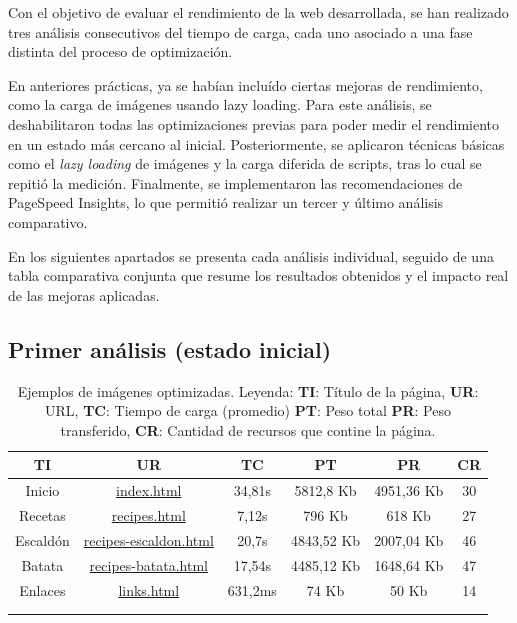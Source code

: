 \documentclass{article}
\begin{document}
Con el objetivo de evaluar el rendimiento de la web desarrollada, se han realizado tres análisis consecutivos del tiempo de carga, cada uno asociado a una fase distinta del proceso de optimización.

En anteriores prácticas, ya se habían incluído ciertas mejoras de rendimiento, como la carga de imágenes usando lazy loading. Para este análisis, se deshabilitaron todas las optimizaciones previas para poder medir el rendimiento en un estado más cercano al inicial. Posteriormente, se aplicaron técnicas básicas como el \textit{lazy loading} de imágenes y la carga diferida de scripts, tras lo cual se repitió la medición. Finalmente, se implementaron las recomendaciones de PageSpeed Insights, lo que permitió realizar un tercer y último análisis comparativo.

En los siguientes apartados se presenta cada análisis individual, seguido de una tabla comparativa conjunta que resume los resultados obtenidos y el impacto real de las mejoras aplicadas.

\subsection{Primer análisis (estado inicial)}\label{subsec:primer-analisis}

\begin{longtable}{c|c|c|c|c|c}
    \hline
    \textbf{TI} & \textbf{UR} & \textbf{TC} & \textbf{PT} & \textbf{PR} & \textbf{CR} \\
    \endhead
    \hline
    Inicio & \href{https://www.danielramos.me/hhyc-dramosac/index.html}{index.html} & 34,81s & 5812,8 Kb & 4951,36 Kb & 30 \\
    Recetas & \href{https://www.danielramos.me/hhyc-dramosac/recipes.html}{recipes.html} & 7,12s & 796 Kb & 618 Kb & 27 \\
    Escaldón & \href{https://www.danielramos.me/hhyc-dramosac/recipes-escaldon.html}{recipes-escaldon.html} & 20,7s & 4843,52 Kb & 2007,04 Kb & 46 \\
    Batata & \href{https://www.danielramos.me/hhyc-dramosac/recipes-batata.html}{recipes-batata.html} & 17,54s & 4485,12 Kb & 1648,64 Kb & 47 \\
    Enlaces & \href{https://www.danielramos.me/hhyc-dramosac/links.html}{links.html} & 631,2ms & 74 Kb & 50 Kb & 14 \\
    \hline
     \\[1.5ex]
     \caption{
          Ejemplos de imágenes optimizadas.
          Leyenda: 
          \textbf{TI}: Título de la página, 
          \textbf{UR}: URL, 
          \textbf{TC}: Tiempo de carga (promedio) 
          \textbf{PT}: Peso total 
          \textbf{PR}: Peso transferido, 
          \textbf{CR}: Cantidad de recursos que contine la página.
     }
    \label{tab:imagenes-optimizadas}
\end{longtable}
\end{document}
